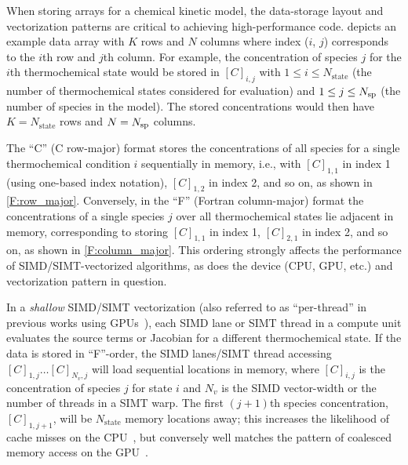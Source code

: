 \documentclass[12pt,number,sort&compress,preprint]{elsarticle}
\newcommand{\revise}[1]{{\sloppy\textcolor{RoyalPurple}{#1}}}  %
\begin{document}
When storing arrays for a chemical kinetic model, the data-storage layout and vectorization patterns are critical to achieving high-performance code.
 depicts an example data array with $K$ rows and $N$ columns \revise{where} index ($i$, $j$) \revise{corresponds} to the $i$th row and $j$th column.
For example, the concentration of species $j$ for the $i$th thermochemical state would be stored in $[C]_{i, j}$ with $1 \le i \le N_{\text{state}}$ (the number of thermochemical states considered for evaluation) and $1 \le j \le \ns/$ (the number of species in the model).
The stored concentrations would then have $K = N_{\text{state}}$ rows and $N = \ns/$ columns.

The ``C'' (C row-major) format stores the concentrations of all species for a single thermochemical condition $i$  sequentially in memory, i.e., with  $[C]_{1, 1}$ in index 1 (\revise{using one-based index notation}), $[C]_{1, 2}$ in index 2, and so on, as shown in \cref{F:row_major}.
Conversely, in the ``F'' (Fortran column-major) format the concentrations of a single species $j$ over all thermochemical states lie adjacent in memory, corresponding to storing $[C]_{1, 1}$ in index 1, $[C]_{2, 1}$ in index 2, and so on, as shown in \cref{F:column_major}.
This ordering \revise{strongly affects} the performance of SIMD\slash SIMT-vectorized algorithms, \revise{as does the device (CPU, GPU, etc.\@) and vectorization pattern in question.}

In a \textit{shallow} SIMD\slash SIMT vectorization (also referred to as ``per-thread'' in previous works using GPUs~\cite{Stone:2013aa}), each SIMD lane or SIMT thread in a compute unit evaluates the source terms or Jacobian for a different thermochemical state.
If the data is stored in ``F''-order, the SIMD lanes\slash SIMT thread accessing $[C]_{1, j}\ldots[C]_{N_v, j}$ will load sequential locations in memory, \revise{where $[C]_{i, j}$ is the concentration of species $j$ for state $i$ and $N_v$ is the SIMD vector-width or the number of threads in a SIMT warp}.
The first $(j+1)$th species concentration, $[C]_{1, j+1}$, will be $N_{\text{state}}$ memory locations away; this increases the likelihood of cache misses on the CPU~\cite{gray2000rules}, but conversely well matches the pattern of coalesced memory access on the GPU~\cite{Nvidia:2018}.
\end{document}
